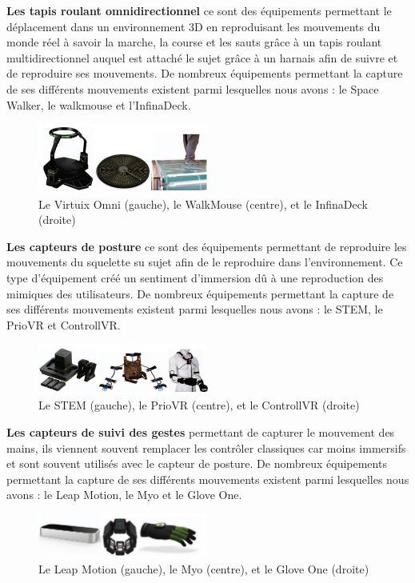 \textbf{Les tapis roulant omnidirectionnel} ce sont des équipements permettant le déplacement dans un environnement 3D en reproduisant les mouvements du monde réel à savoir la marche, la course et les sauts grâce à un tapis roulant multidirectionnel auquel est attaché le sujet grâce à un harnais afin de suivre et de reproduire ses mouvements.
De nombreux équipements permettant la capture de ses différents mouvements existent parmi lesquelles nous avons : le Space Walker, le walkmouse et l'InfinaDeck.

\begin{figure}[H]
	\centering
	\includegraphics[width=0.5\textwidth]{img/3dtap}
	\caption{Le Virtuix Omni (gauche), le WalkMouse (centre), et le InfinaDeck (droite)}
\end{figure}

\textbf{Les capteurs de posture} ce sont des équipements permettant de reproduire les mouvements du squelette su sujet afin de le reproduire dans l'environnement. Ce type d'équipement créé un sentiment d'immersion dû à une reproduction des mimiques des utilisateurs.
De nombreux équipements permettant la capture de ses différents mouvements existent parmi lesquelles nous avons : le STEM, le PrioVR et ControllVR.

\begin{figure}[H]
	\centering
	\includegraphics[width=0.5\textwidth]{img/3dcptt}
	\caption{Le STEM (gauche), le PrioVR (centre), et le ControllVR (droite)}
\end{figure}

\textbf{Les capteurs de suivi des gestes} permettant de capturer le mouvement des mains, ils viennent souvent remplacer les contrôler classiques car moins immersifs et sont souvent utilisés avec le capteur de posture.
De nombreux équipements permettant la capture de ses différents mouvements existent parmi lesquelles nous avons : le Leap Motion, le Myo et le Glove One.

\begin{figure}[H]
	\centering
	\includegraphics[width=0.5\textwidth]{img/3dgan}
	\caption{Le Leap Motion (gauche), le Myo (centre), et le Glove One (droite)}
\end{figure}

